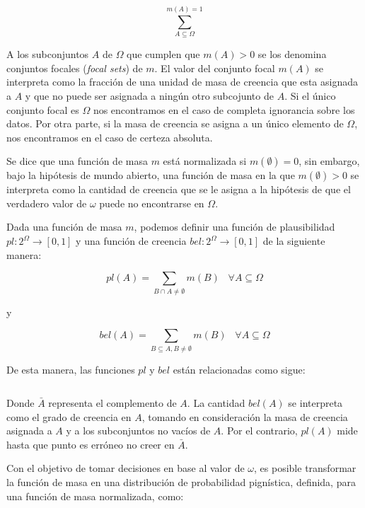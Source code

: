\begin{equation}
\sum_{A \subseteq \Omega}^{m(A) = 1}
\label{eqn3}
\end{equation}

A los subconjuntos $A$ de $\Omega$ que cumplen que $m(A) > 0$ se los denomina conjuntos focales (\textit{focal sets}) de $m$. El valor del conjunto focal $m(A)$ se interpreta como la fracción de una unidad de masa de creencia que esta asignada a $A$ y que no puede ser asignada a ningún otro subcojunto de $A$. Si el único conjunto focal es $\Omega$ nos encontramos en el caso de completa ignorancia sobre los datos. Por otra parte, si la masa de creencia se asigna a un único elemento de $\Omega$, nos encontramos en el caso de certeza absoluta.

Se dice que una función de masa $m$ está normalizada si $m(\emptyset) = 0$, sin embargo, bajo la hipótesis de mundo abierto, una función de masa en la que $m(\emptyset) > 0$ se interpreta como la cantidad de creencia que se le asigna a la hipótesis de que el verdadero valor de $\omega$ puede no encontrarse en $\Omega$.

Dada una función de masa $m$, podemos definir una función de plausibilidad $pl:2^\Omega \rightarrow [0,1]$ y una función de creencia $bel: 2^\Omega \rightarrow [0,1]$ de la siguiente manera:

\begin{equation}
pl(A) = \sum_{B \cap A \neq \emptyset} m(B) \;\;\; \forall A \subseteq \Omega
\label{eqn4}
\end{equation}

y 

\begin{equation}
bel(A) = \sum_{B \subseteq A, B \neq \emptyset} m(B) \;\;\; \forall A \subseteq \Omega
\label{eqn5}
\end{equation}

De esta manera, las funciones $pl$ y $bel$ están relacionadas como sigue:

\begin{equation}
\label{eqn6}
\end{equation}

Donde $\bar{A}$ representa el complemento de $A$.  La cantidad $bel(A)$ se interpreta como el grado de creencia en $A$, tomando en consideración la masa de creencia asignada a $A$ y a los subconjuntos no vacíos de $A$. Por el contrario, $pl(A)$ mide hasta que punto es erróneo no creer en $\bar{A}$.

Con el objetivo de tomar decisiones en base al valor de $\omega$, es posible transformar la función de masa en una distribución de probabilidad pignística, definida, para una función de masa normalizada, como:


